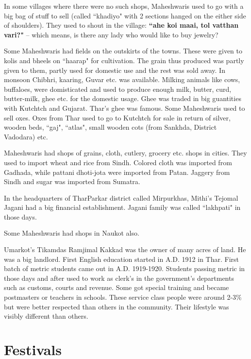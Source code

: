 In some villages where there were no such shops, Maheshwaris used to go with a big bag of stuff to sell (called ``khadiyo" with 2 sections hanged on the either side of shoulders). They used to shout in the village: \textbf{``ahe koi maai, tol vatthan vari?"} -- which means, is there any lady who would like to buy jewelry?

Some Maheshwaris had fields on the outskirts of the towns. These were given to kolis and bheels on ``haarap" for cultivation. The grain thus produced was partly given to them, partly used for domestic use and the rest was sold away. In monsoon Chibhri, kaaring, Guvar etc. was available. Milking animals like cows, buffaloes, were domisticated and used to produce enough milk, butter, curd, butter-milk, ghee etc. for the domestic usage. Ghee was traded in big guantities with Kutchtch and Gujarat. Thar's ghee was famous. Some Maheshwaris used to sell oxes. Oxes from Thar used to go to Kutchtch for sale in return of silver, wooden beds, ``gaj", ``atlas", small wooden cots (from Sankhda, District Vadodara) etc.

Maheshwaris had shops of grains, cloth, cutlery, grocery etc. shops in cities. They used to import wheat and rice from Sindh. Colored cloth was imported from Gadhada, while pattani dhoti-jota were imported from Patan. Jaggery from Sindh and sugar was imported from Sumatra.

In the headquarters of TharParkar district called Mirpurkhas, Mithi's Tejomal Jagani had a big financial establishment. Jagani family was called ``lakhpati" in those days.

Some Maheshwaris had shops in Naukot also.

Umarkot's Tikamdas Ramjimal Kakkad was the owner of many acres of land. He was a big landlord. First English education started in A.D. 1912 in Thar. First batch of metric students came out in A.D. 1919-1920. Students passing metric  in those days and after used to work as clerk's in the government's departments such as customs, courts and revenue. Some got special training and became postmasters or teachers in schools. These service class people were around 2-3\% but were better respected than others in the community. Their lifestyle was visibly different than others.
\section{Festivals}
